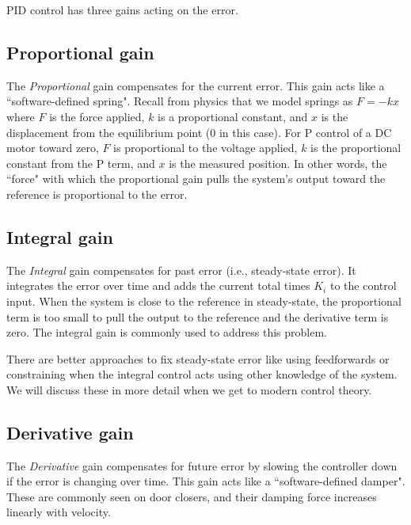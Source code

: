 PID control has three gains acting on the \gls{error}.

\subsection{Proportional gain}

The \textit{Proportional} gain compensates for the current \gls{error}. This
gain acts like a ``software-defined spring". Recall from physics that we model
springs as $F = -kx$ where $F$ is the force applied, $k$ is a proportional
constant, and $x$ is the displacement from the equilibrium point ($0$ in this
case). For P control of a DC motor toward zero, $F$ is proportional to the
voltage applied, $k$ is the proportional constant from the P term, and $x$ is
the measured position. In other words, the ``force" with which the proportional
gain pulls the \gls{system}'s \gls{output} toward the \gls{reference} is
proportional to the \gls{error}.

\subsection{Integral gain}

The \textit{Integral} gain compensates for past \gls{error} (i.e.,
\gls{steady-state error}). It integrates the \gls{error} over time and adds the
current total times $K_i$ to the \gls{control input}. When the \gls{system} is
close to the \gls{reference} in steady-state, the proportional term is too small
to pull the \gls{output} to the \gls{reference} and the derivative term is zero.
The integral gain is commonly used to address this problem.

There are better approaches to fix \gls{steady-state error} like using
feedforwards or constraining when the integral control acts using other
knowledge of the \gls{system}. We will discuss these in more detail when we get
to modern control theory.

\subsection{Derivative gain}

The \textit{Derivative} gain compensates for future \gls{error} by slowing the
controller down if the \gls{error} is changing over time. This gain acts like a
``software-defined damper". These are commonly seen on door closers, and their
damping force increases linearly with velocity.

